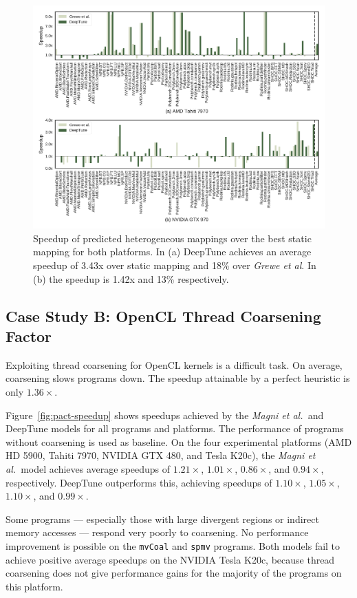 \begin{figure}
  \centering %
  \includegraphics[width=\textwidth]{img/cgo-speedup}%
  \caption[Speedup of predicted heterogeneous mappings]{%
    Speedup of predicted heterogeneous mappings over the best static mapping for both platforms. In (a) DeepTune achieves an average speedup of 3.43x over static mapping and 18\% over \emph{Grewe et al}. In (b) the speedup is 1.42x and 13\% respectively.%
  }
  \label{fig:cgo-speedup}
\end{figure}


\subsection{Case Study B: OpenCL Thread Coarsening Factor}

Exploiting thread coarsening for OpenCL kernels is a difficult task. On average, coarsening slows programs down. The speedup attainable by a perfect heuristic is only $1.36\times$.

Figure~\ref{fig:pact-speedup} shows speedups achieved by the \emph{Magni et al.\ }and DeepTune models for all programs and platforms. The performance of programs without coarsening is used as baseline. On the four experimental platforms (AMD HD 5900, Tahiti 7970, NVIDIA GTX 480, and Tesla K20c), the \emph{Magni et al.\ }model achieves average speedups of $1.21\times$, $1.01\times$, $0.86\times$, and $0.94\times$, respectively. DeepTune outperforms this, achieving speedups of $1.10\times$, $1.05\times$, $1.10\times$, and $0.99\times$.

Some programs --- especially those with large divergent regions or indirect memory accesses --- respond very poorly to coarsening. No performance improvement is possible on the \texttt{mvCoal} and \texttt{spmv} programs. Both models fail to achieve positive average speedups on the NVIDIA Tesla K20c, because thread coarsening does not give performance gains for the majority of the programs on this platform.

